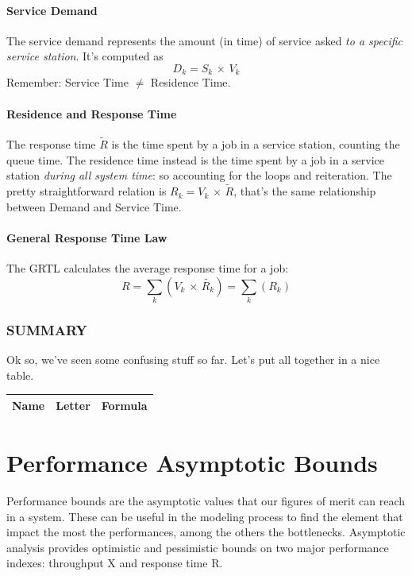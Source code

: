 \documentclass[10pt,a4paper]{article}
\begin{document}
				\paragraph{Service Demand}
					The service demand represents the amount (in time) of service asked \emph{to a specific service station}. It's computed as
					\begin{equation}
						D_k = S_k \,\times\, V_k
					\end{equation}
					Remember: Service Time $\neq$ Residence Time. 
					
				\paragraph{Residence and Response Time}
					The response time $\tilde{R}$ is the time spent by a job in a service station, counting the queue time. The residence time instead is the time spent by a job in a service station \emph{during all system time}: so accounting for the loops and reiteration. The pretty straightforward relation is $R_k = V_k \,\times\, \tilde{R}$, that's the same relationship between Demand and Service Time. 
					
				\paragraph{General Response Time Law}
					The GRTL calculates the average response time for a job:
					\begin{equation}
						R = \sum_k (V_k \,\times\, \tilde{R_k}) = \sum_k (R_k)
					\end{equation}
					
				\subsubsection{SUMMARY}
					Ok so, we've seen some confusing stuff so far. Let's put all together in a nice table.
					\begin{center}
						\begin{tabular}{ | c || c | c | }
							Name & Letter & Formula \\
							\hline
							\hline

						\end{tabular}
					\end{center}
		\section{Performance Asymptotic Bounds}
			Performance bounds are the asymptotic values that our figures of merit can reach in a system. These can be useful in the modeling process to find the element that impact the most the performances, among the others the bottlenecks. Asymptotic analysis provides optimistic and pessimistic bounds on two major performance indexes: throughput X and response time R.
			
\end{document}
